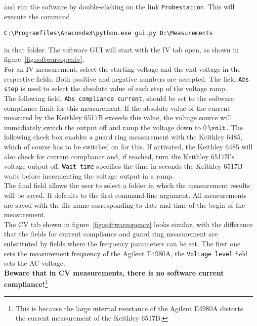 \documentclass[a4paper]{article}
\begin{document}
and run the software by double-clicking on the link {\tt Probestation}.
This will execute the command

\medskip
\begin{lstlisting}
C:\Programfiles\Anaconda3\python.exe gui.py D:\Measurements
\end{lstlisting}
\medskip

in that folder.
The software GUI will start with the IV tab open, as shown in figure~\ref{fig:softwareopeniv}.\\

For an IV measurement, select the starting voltage and the end voltage in the respective fields.
Both positive and negative numbers are accepted.
The field {\tt Abs step} is used to select the absolute value of each step of the voltage ramp.\\

The following field, {\tt Abs compliance current}, should be set to the software compliance limit for this measurement.
If the absolute value of the current measured by the Keithley 6517B exceeds this value, the voltage source will immediately switch the output off and ramp the voltage down to $0\,\volt$.
The following check box enables a guard ring measurement with the Keithley 6485, which of course has to be switched on for this.
If activated, the Keithley 6485 will also check for current compliance and, if reached, turn the Keithley 6517B's voltage output off.
{\tt Wait time} specifies the time in seconds the Keithley 6517B waits before incrementing the voltage output in a ramp.\\

The final field allows the user to select a folder in which the measurement results will be saved.
It defaults to the first command-line argument.
All measurements are saved with the file name corresponding to date and time of the begin of the measurement.\\

The CV tab shown in figure~\ref{fig:softwareopencv} looks similar, with the difference that the fields for current compliance and guard ring measurement are substituted by fields where the frequency parameters can be set.
The first one sets the measurement frequency of the Agilent E4980A, the {\tt Voltage level} field sets the AC voltage.\\

{\bf Beware that in CV measurements, there is no software current compliance!}\footnote{This is because the large internal resistance of the Agilent E4980A distorts the current measurement of the Keithley 6517B.}\\
\end{document}
